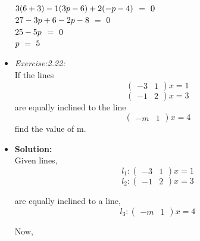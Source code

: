\documentclass{article}
\begin{document}
\begin{itemize}
 \hspace{2 cm}$3(6+3)-1(3p-6)+2(-p-4)\hspace{0.2 cm}$\not=$\hspace{0.2 cm}0$\\

 \hspace{2 cm}$27-3p+6-2p-8\hspace{0.2 cm}$\not=$\hspace{0.2 cm}0$\\

 \hspace{2 cm}$25-5p\hspace{0.2 cm}$\not=$\hspace{0.2 cm}0$\\

 \hspace{2 cm}$p\hspace{0.2 cm}$\not=$\hspace{0.2 cm}5$\\
 
\item{\textit{Exercise:2.22:}}\\

If  the  lines \[ \begin{pmatrix} -3 & 1\end{pmatrix}x =1\] \[ \begin{pmatrix} -1 & 2\end{pmatrix}x=3\]are equally inclined to the line \[ \begin{pmatrix} -m & 1\end{pmatrix}x=4\] find the value of m.

\item{\textbf{Solution:}}\\

Given lines,\\

\[l_1: \begin{pmatrix} -3 & 1\end{pmatrix}x =1\]
\[l_2: \begin{pmatrix} -1 & 2\end{pmatrix}x=3\] 

are equally inclined to a line,\\

\[l_3: \begin{pmatrix} -m & 1\end{pmatrix}x=4\]

Now,\\


\end{itemize}
\end{document}
